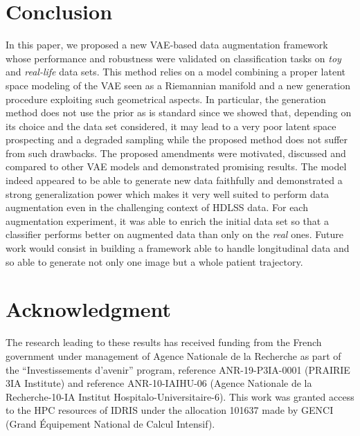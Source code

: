 \documentclass[10pt,journal,compsoc]{IEEEtran}
\begin{document}
\section{Conclusion}

In this paper, we proposed a new VAE-based data augmentation framework whose performance and robustness were validated on classification tasks on \emph{toy} and \emph{real-life} data sets. This method relies on a model combining a proper latent space modeling of the VAE seen as a Riemannian manifold and a new generation procedure exploiting such geometrical aspects. In particular, the generation method does not use the prior as is standard since we showed that, depending on its choice and the data set considered, it may lead to a very poor latent space prospecting and a degraded sampling while the proposed method does not suffer from such drawbacks. The proposed amendments were motivated, discussed and compared to other VAE models and demonstrated promising results. The model indeed appeared to be able to generate new data faithfully and demonstrated a strong generalization power which makes it very well suited to perform data augmentation even in the challenging context of HDLSS data.
For each augmentation experiment, it was able to enrich the initial data set so that a classifier performs better on augmented data than only on the \emph{real} ones. Future work would consist in building a framework able to handle longitudinal data and so able to generate not only one image but a whole patient trajectory.

\section*{Acknowledgment}

The research leading to these results has received funding from the French government under management of Agence Nationale de la Recherche as part of the ``Investissements d'avenir'' program, reference ANR-19-P3IA-0001 (PRAIRIE 3IA Institute) and reference ANR-10-IAIHU-06 (Agence Nationale de la Recherche-10-IA Institut Hospitalo-Universitaire-6). 
This work was granted access to the HPC resources of IDRIS under the allocation 101637 made by GENCI (Grand Équipement National de Calcul Intensif).
\end{document}
